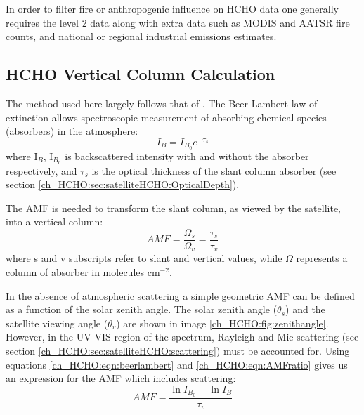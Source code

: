     In order to filter fire or anthropogenic influence on HCHO data one generally requires the level 2 data along with extra data such as MODIS and AATSR fire counts, and national or regional industrial emissions estimates.
  
  \subsection{HCHO Vertical Column Calculation}
    \label{ch_HCHO:sec:satelliteHCHO:CalculationOfVC}
    
    The method used here largely follows that of \citet{Palmer2001}.
    The Beer-Lambert law of extinction allows spectroscopic measurement of absorbing chemical species (absorbers) in the atmosphere:
    \begin{equation} \label{ch_HCHO:eqn:beerlambert}
      I_B = I_{B_0} e^{-\tau_s}
    \end{equation}
    where I$_B$, I$_{B_0}$ is backscattered intensity with and without the absorber respectively, and $\tau_s$ is the optical thickness of the slant column absorber (see section \ref{ch_HCHO:sec:satelliteHCHO:OpticalDepth}).

    The AMF is needed to transform the slant column, as viewed by the satellite, into a vertical column:
    \begin{equation} \label{ch_HCHO:eqn:AMFratio}
      AMF = \frac{\Omega_s}{\Omega_v} = \frac{\tau_s}{\tau_v}
    \end{equation}
    where s and v subscripts refer to slant and vertical values, while $\Omega$ represents a column of absorber in molecules cm$^{-2}$.

    In the absence of atmospheric scattering a simple geometric AMF can be defined as a function of the solar zenith angle. 
    The solar zenith angle ($\theta_s$) and the satellite viewing angle ($\theta_v$) are shown in image \ref{ch_HCHO:fig:zenithangle}.
    However, in the UV-VIS region of the spectrum, Rayleigh and Mie scattering (see section \ref{ch_HCHO:sec:satelliteHCHO:scattering}) must be accounted for.
    Using equations \ref{ch_HCHO:eqn:beerlambert} and \ref{ch_HCHO:eqn:AMFratio} gives us an expression for the AMF which includes scattering:
    \begin{equation} \label{ch_HCHO:eqn:AMFscattering}
      AMF = \frac{\ln{I_{B_0}}-\ln{I_B}}{\tau_v}
    \end{equation}

